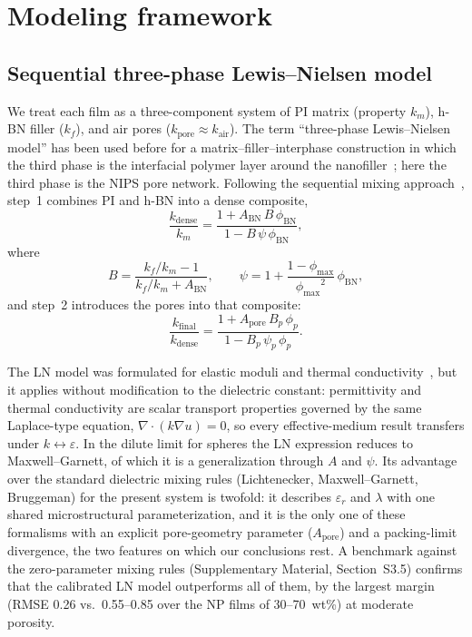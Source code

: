 \documentclass[preprint,a4paper]{elsarticle}
\newcommand{\eps}{\ensuremath{\varepsilon_r}}   %
\newcommand{\lam}{\ensuremath{\lambda}}
\newcommand{\phimax}{\ensuremath{\phi_{\max}}}
\newcommand{\phiBN}{\ensuremath{\phi_{\mathrm{BN}}}}
\newcommand{\Apore}{\ensuremath{A_{\mathrm{pore}}}}
\newcommand{\ABN}{\ensuremath{A_{\mathrm{BN}}}}
\begin{document}
\section{Modeling framework}
\label{sec:model}

\subsection{Sequential three-phase Lewis--Nielsen model}
\label{sec:lnmodel}
We treat each film as a three-component system of PI matrix (property $k_m$), h-BN filler ($k_f$), and air pores ($k_{\mathrm{pore}} \approx k_{\mathrm{air}}$). The term ``three-phase Lewis--Nielsen model'' has been used before for a matrix--filler--interphase construction in which the third phase is the interfacial polymer layer around the nanofiller~\cite{kochetov2011threephase}; here the third phase is the NIPS pore network. Following the sequential mixing approach~\cite{progelhof1976methods}, step~1 combines PI and h-BN into a dense composite,
\begin{equation}
\frac{k_{\mathrm{dense}}}{k_m} = \frac{1 + \ABN\, B\, \phiBN}{1 - B\, \psi\, \phiBN},
\label{eq:step1}
\end{equation}
where
\begin{equation}
B = \frac{k_f/k_m - 1}{k_f/k_m + \ABN}, \qquad
\psi = 1 + \frac{1-\phimax}{\phimax^{2}}\,\phiBN ,
\label{eq:Bpsi}
\end{equation}
and step~2 introduces the pores into that composite:
\begin{equation}
\frac{k_{\mathrm{final}}}{k_{\mathrm{dense}}} = \frac{1 + \Apore\, B_p\, \phi_p}{1 - B_p\, \psi_p\, \phi_p}.
\label{eq:step2}
\end{equation}

The LN model was formulated for elastic moduli and thermal conductivity~\cite{lewis1970dynamic,nielsen1973thermal}, but it applies without modification to the dielectric constant: permittivity and thermal conductivity are scalar transport properties governed by the same Laplace-type equation, $\nabla\!\cdot\!(k\nabla u)=0$, so every effective-medium result transfers under $k \leftrightarrow \varepsilon$. In the dilute limit for spheres the LN expression reduces to Maxwell--Garnett, of which it is a generalization through $A$ and $\psi$. Its advantage over the standard dielectric mixing rules (Lichtenecker, Maxwell--Garnett, Bruggeman) for the present system is twofold: it describes \eps{} and \lam{} with one shared microstructural parameterization, and it is the only one of these formalisms with an explicit pore-geometry parameter (\Apore) and a packing-limit divergence, the two features on which our conclusions rest. A benchmark against the zero-parameter mixing rules (Supplementary Material, Section~S3.5) confirms that the calibrated LN model outperforms all of them, by the largest margin (RMSE 0.26 vs.\ 0.55--0.85 over the NP films of 30--70~wt\%) at moderate porosity.
\end{document}
